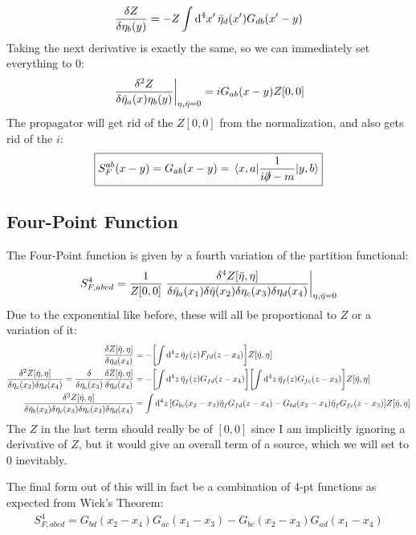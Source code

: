 \documentclass[12pt]{article}
\newcommand{\D}{\partial}
\newcommand{\etab}{\bar{\eta}}
\renewcommand{\d}{\delta}
\begin{document}
\begin{align*}
  \fdv{Z}{\eta_b(y)}=-Z\int\dd[4]{x'}
  \etab_d(x')G_{db}(x'-y)
\end{align*}
Taking the next derivative is exactly the same, so we can immediately set everything to $0$:
\begin{align*}
  \eval{\frac{\delta^2Z}{\delta\etab_a(x)\eta_b(y)}}_{\eta,\etab=0}=
  iG_{ab}(x-y)Z[0,0]
\end{align*}
The propagator will get rid of the $Z[0,0]$ from the normalization, and also gets rid of the $i$:
\begin{align*}
  \boxed{S^{ab}_F(x-y)=G_{ab}(x-y)=\mel{x,a}{\frac{1}{i\slashed{\D}-m}}{y,b}}
\end{align*}
\subsection{Four-Point Function}
The Four-Point function is given by a fourth variation of the partition functional:
\begin{align*}
  S_{F,abcd}^4=\frac{1}{Z[0,0]}\eval{\frac{\delta^4Z[\etab,\eta]}{\delta \etab_a(x_1)\delta\etab(x_2)\delta\eta_c(x_3)\delta\eta_d(x_4)}}_{\eta,\etab=0}
\end{align*}
Due to the exponential like before, these will all be proportional to $Z$ or a variation of it:
\begin{align*}
  \fdv{Z[\etab,\eta]}{\eta_d(x_4)}&=
  -\qty[\int\dd[4]{z}\etab_f(z)F_{fd}(z-x_4)]Z[\etab,\eta]\\
  \frac{\delta^2Z[\etab,\eta]}{\delta\eta_c(x_3)\delta\eta_d(x_4)}=
  \fdv{\eta_c(x_3)}\fdv{Z[\etab,\eta]}{\eta_d(x_4)}&=
  -\qty[\int\dd[4]{z}\etab_f(z)G_{fd}(z-x_4)]
  \qty[\int\dd[4]{z}\etab_f(z)G_{fc}(z-x_3)]Z[\etab,\eta]\\
  \frac{\d^3Z[\etab,\eta]}{\d\etab_b(x_2)\d\eta_c(x_3)\d\eta_c(x_3)\d\eta_d(x_4)}
  &=\int\dd[4]{z}\qty[G_{bc}(x_2-x_3)\etab_fG_{fd}(z-x_4)-
  G_{bd}(x_2-x_4)\etab_fG_{fc}(z-x_3)]Z[\etab,\eta]
\end{align*}
The $Z$ in the last term should really be of $[0,0]$ since I am implicitly ignoring a derivative of $Z$, but it would give an overall term of a source, which we will set to $0$ inevitably.

The final form out of this will in fact be a combination of 4-pt functions as expected from Wick's Theorem:
\begin{align*}
  \boxed{S^4_{F,abcd}=G_{bd}(x_2-x_4)G_{ac}(x_1-x_3)
    -G_{bc}(x_2-x_3)G_{ad}(x_1-x_4)}
\end{align*}
\end{document}
